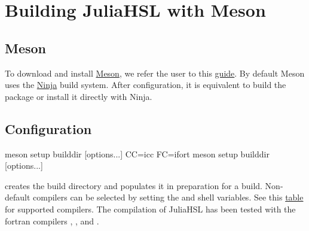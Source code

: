 \documentclass[gdweb]{geradwp}
\newcommand{\JuliaHSL}{JuliaHSL\xspace}  %
\begin{document}
\section{Building \JuliaHSL with Meson}

\subsection{Meson}

To download and install \href{https://mesonbuild.com}{Meson}, we refer the user to this \href{https://mesonbuild.com/SimpleStart.html}{guide}.
By default Meson uses the \href{https://ninja-build.org/}{Ninja} build system.
After configuration, it is equivalent to build the package or install it directly with Ninja.

\subsection{Configuration}

\begin{jllisting}
meson setup builddir [options...]
CC=icc FC=ifort meson setup builddir [options...]
\end{jllisting}
creates the build directory  and populates it in preparation for a build.
Non-default compilers can be selected by setting the  and  shell variables.
See this \href{https://mesonbuild.com/Reference-tables.html}{table} for supported compilers.
The compilation of \JuliaHSL has been tested with the fortran compilers , ,  and .
\end{document}
